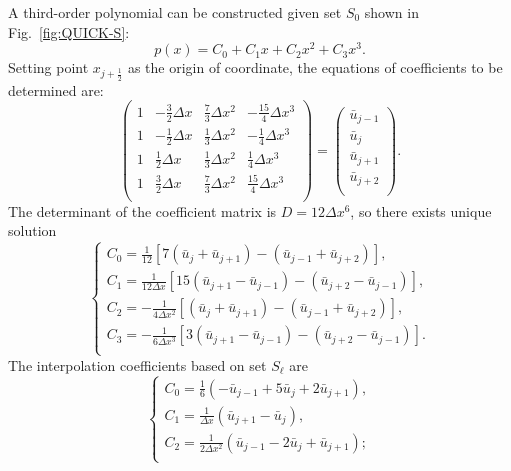 \documentclass[]{article}
\def\Matrix#1{\left(#1\right)}
\def\jph{{j+\frac{1}{2}}}
\def\Matrix#1{\left(#1\right)}
\begin{document}
A third-order polynomial can be constructed given set $S_0$ shown in
Fig.~\ref{fig:QUICK-S}:
\begin{equation*}
p(x) = C_0 + C_1 x + C_2 x^2 + C_3 x^3.
\end{equation*}
Setting point $x_\jph$ as the origin of coordinate, the equations of
coefficients to be determined are:
\begin{equation*}
\Matrix{\begin{array}{crrr}
1 & -\frac{3}{2}\Delta x & \frac{7}{3}\Delta x^2 & -\frac{15}{4}\Delta x^3 \\
1 & -\frac{1}{2}\Delta x & \frac{1}{3}\Delta x^2 & -\frac{1}{4}\Delta x^3 \\
1 & \frac{1}{2}\Delta x & \frac{1}{3}\Delta x^2 & \frac{1}{4}\Delta x^3 \\
1 & \frac{3}{2}\Delta x & \frac{7}{3}\Delta x^2 & \frac{15}{4}\Delta x^3 \\
\end{array}}
=\Matrix{\begin{array}{l}
\bar u_{j-1}\\ \bar u_{j} \\ \bar u_{j+1} \\ \bar u_{j+2} \\
\end{array}}.
\end{equation*}
The determinant of the coefficient matrix is $D = 12\Delta x^6$, so there exists
unique solution
\begin{equation*}
\left\{\begin{array}{l}
\displaystyle
C_0 = \frac{1}{12}\left[7(\bar u_j+\bar u_{j+1})-(\bar u_{j-1}+\bar u_{j+2})\right],\\[3mm]
\displaystyle
C_1= \frac{1}{12\Delta x}\left[15(\bar u_{j+1}-\bar u_{j-1})-(\bar u_{j+2}-\bar u_{j-1})\right],\\[3mm]
\displaystyle
C_2 = -\frac{1}{4\Delta x^2}\left[(\bar u_j+\bar u_{j+1})-(\bar u_{j-1}+\bar u_{j+2})\right],\\[3mm]
\displaystyle
C_3= -\frac{1}{6\Delta x^3}\left[3(\bar u_{j+1}-\bar u_{j-1})-(\bar u_{j+2}-\bar u_{j-1})\right].\\
\end{array}\right.
\end{equation*}
The interpolation coefficients based on set 
$S_\ell$ are
\begin{equation*}
\left\{\begin{array}{l}
\displaystyle
C_0 = \frac{1}{6}(-\bar u_{j-1}+5\bar u_j+2\bar u_{j+1}),\\[3mm]
\displaystyle
C_1= \frac{1}{\Delta x}(\bar u_{j+1}-\bar u_{j}),\\[3mm]
\displaystyle
C_2 = \frac{1}{2\Delta x^2}(\bar u_{j-1}-2\bar u_j+\bar u_{j+1});\\[3mm]
\end{array}\right.
\end{equation*}
\end{document}
